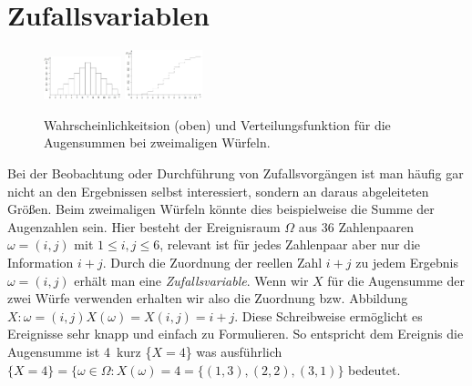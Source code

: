 \section{Zufallsvariablen}
\begin{figure}
    \vspace{-10mm}
    \centering
    \includegraphics[width=0.2\textwidth]{images/5.1_f_augensumme.png}
    \includegraphics[width=0.2\textwidth]{images/5.2_F_augensumme.png}
    \caption{Wahrscheinlichkeitsion (oben) und Verteilungsfunktion für die Augensummen bei zweimaligen Würfeln.}
    \vspace{-3mm}
    \label{fig:f_F_dice}
\end{figure}
Bei der Beobachtung oder Durchführung von Zufallsvorgängen ist man häufig gar nicht an den Ergebnissen selbst interessiert, sondern an daraus abgeleiteten Größen. Beim zweimaligen Würfeln könnte dies beispielweise die Summe der Augenzahlen sein. Hier besteht der Ereignisraum $\Omega$ aus 36 Zahlenpaaren $\omega = (i, j)$ mit $1 \le i,j \le 6$, relevant ist für jedes Zahlenpaar aber nur die Information $i + j$. Durch die Zuordnung der reellen Zahl $i + j$ zu jedem Ergebnis $\omega = (i, j)$ erhält man eine \emph{Zufallsvariable}. Wenn wir $X$ für die Augensumme der zwei Würfe verwenden erhalten wir also die Zuordnung bzw. Abbildung $X: \omega = (i, j) X(\omega) = X(i, j) = i + j$. Diese Schreibweise ermöglicht es Ereignisse sehr knapp und einfach zu Formulieren. So entspricht dem Ereignis \glqq die Augensumme ist 4\grqq\, kurz \{$X=4$\} was ausführlich $\{X = 4\} = \{\omega \in \Omega: X(\omega) = 4 = \{(1,3), (2,2), (3,1)\}$ bedeutet. 
